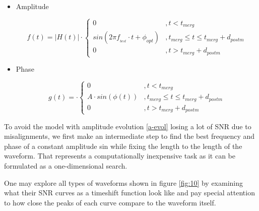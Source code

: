 \begin{itemize}

\item Amplitude


\begin{equation}\label{a-evol}
f(t) = |H(t)| \cdot \begin{cases} 
      0 &, t< t_{merg} \\
      sin(2\pi f_{_{best}}\cdot t + \phi_{opt}) &, t_{merg} \leq t \leq t_{merg} + d_{postm} \\
      0 &, t> t_{merg} + d_{postm}
   \end{cases}
\end{equation}

\item Phase

\begin{equation}\label{pha-evol}
g(t) = \cdot \begin{cases} 
      0 &, t< t_{merg} \\
      A \cdot sin(\phi(t)) &, t_{merg} \leq t \leq t_{merg} + d_{postm} \\
      0 &, t> t_{merg} + d_{postm}
   \end{cases}
\end{equation}

\end{itemize}

To avoid the model with amplitude evolution \ref{a-evol} losing a lot of SNR due to misalignments, we first make an intermediate step to find the best frequency and phase of a constant amplitude sin while fixing the length to the length of the waveform. That represents a computationally inexpensive task as it can be formulated as a one-dimensional search.


One may explore all types of waveforms shown in figure \ref{fig:10} by examining what their SNR curves as a timeshift function look like and pay special attention to how close the peaks of each curve compare to the waveform itself.

